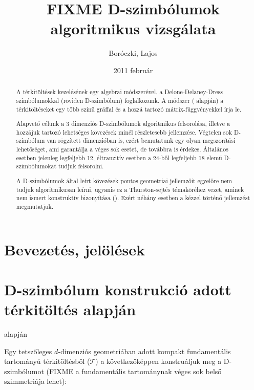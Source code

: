 \documentclass[12pt,magyar,a4paper]{article}
\begin{document}
\title{FIXME D-szimbólumok algoritmikus vizsgálata}
\author{Boróczki, Lajos}
\date{2011 február}
\maketitle

\begin{abstract}
  A térkitöltések kezelésének egy algebrai módszerével, a Delone-Delaney-Dress
  szimbólumokkal (röviden D-szimbólum) foglalkozunk. A módszer (\cite{xy}
  alapján) a térkitöltéseket egy több színű gráffal és a hozzá tartozó
  mátrix-függvényekkel írja le.

  Alapvető célunk a 3 dimenziós D-szimbólumok algoritmikus felsorolása, illetve
  a hozzájuk tartozó lehetséges kövezések minél részletesebb jellemzése.
  Végtelen sok D-szimbólum van rögzített dimenzióban is, ezért bemutatunk egy
  olyan megszorítási lehetőséget, ami garantálja a véges sok esetet, de
  továbbra is érdekes. Általános esetben jelenleg legfeljebb 12, éltranzitív
  esetben a 24-ből legfeljebb 18 elemű D-szimbólumokat tudjuk felsorolni.

  A D-szimbólumok által leírt kövezések pontos geometriai jellemzőit egyelőre
  nem tudjuk algoritmikusan leírni, ugyanis ez a Thurston-sejtés témaköréhez
  vezet, aminek nem ismert konstruktív bizonyítása (\cite{xy}). Ezért
  néhány esetben a kézzel történő jellemzést megmutatjuk.
\end{abstract}

\section{Bevezetés, jelölések}



\section{D-szimbólum konstrukció adott térkitöltés alapján}
\cite{xy} alapján

Egy tetszőleges $d$-dimenziós geometriában adott kompakt fundamentális
tartományú térkitöltésből ($\mathcal{T}$) a következőképpen konstruáljuk meg a
D-szimbólumot (FIXME a fundamentális tartománynak véges sok belső szimmetriája
lehet):
\end{document}
